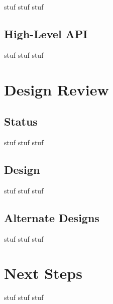 \documentclass[11pt]{article}
\begin{document}
stuf stuf stuf

\subsection{High-Level API}

stuf stuf stuf

\section{Design Review}

\subsection{Status}

stuf stuf stuf

\subsection{Design}

stuf stuf stuf

\subsection{Alternate Designs}

stuf stuf stuf

\section{Next Steps}

stuf stuf stuf
\end{document}
